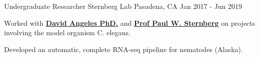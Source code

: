 \begin{cventries}
\cventry
  {Undergraduate Researcher} %
  {Sternberg Lab} %
  {Pasadena, CA} %
  {Jan 2017 - Jun 2019} %
  {
    \begin{cvitems} %
      \item {Worked with \textbf{\href{https://dangeles.github.io/}{David Angeles PhD.}} and \textbf{\href{http://wormlab.caltech.edu/LabMembers/Paul}{Prof Paul W. Sternberg}} on projects involving the model organism C. elegans.}
      \item {Developed an automatic, complete RNA-seq pipeline for nematodes (Alaska).}
    \end{cvitems}
  }

\end{cventries}
